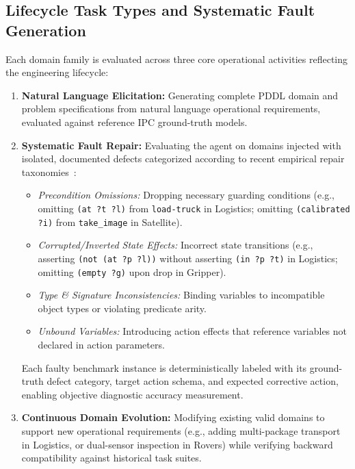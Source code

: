 \documentclass[10pt,a4paper]{article}
\begin{document}
\subsection{Lifecycle Task Types and Systematic Fault Generation}
Each domain family is evaluated across three core operational activities reflecting the engineering lifecycle:
\begin{enumerate}[label=(\alph*),leftmargin=1.4em]
    \item \textbf{Natural Language Elicitation:} Generating complete PDDL domain and problem specifications from natural language operational requirements, evaluated against reference IPC ground-truth models.
    \item \textbf{Systematic Fault Repair:} Evaluating the agent on domains injected with isolated, documented defects categorized according to recent empirical repair taxonomies~\cite{bavandpour2026llmonly}:
    \begin{itemize}
        \item \textit{Precondition Omissions:} Dropping necessary guarding conditions (e.g., omitting \texttt{(at ?t ?l)} from \texttt{load-truck} in Logistics; omitting \texttt{(calibrated ?i)} from \texttt{take\_image} in Satellite).
        \item \textit{Corrupted/Inverted State Effects:} Incorrect state transitions (e.g., asserting \texttt{(not (at ?p ?l))} without asserting \texttt{(in ?p ?t)} in Logistics; omitting \texttt{(empty ?g)} upon drop in Gripper).
        \item \textit{Type \& Signature Inconsistencies:} Binding variables to incompatible object types or violating predicate arity.
        \item \textit{Unbound Variables:} Introducing action effects that reference variables not declared in action parameters.
    \end{itemize}
    Each faulty benchmark instance is deterministically labeled with its ground-truth defect category, target action schema, and expected corrective action, enabling objective diagnostic accuracy measurement.
    \item \textbf{Continuous Domain Evolution:} Modifying existing valid domains to support new operational requirements (e.g., adding multi-package transport in Logistics, or dual-sensor inspection in Rovers) while verifying backward compatibility against historical task suites.
\end{enumerate}

\end{document}
